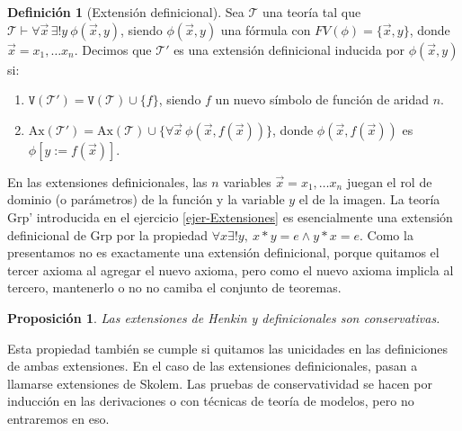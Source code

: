 \documentclass[a4paper, 12pt]{report}
\newcommand{\te}{\text}
\newtheorem{prop}[teorema]{Proposición}
\theoremstyle{definition}
\newtheorem{definicion}[teorema]{Definición}
\begin{document}
\begin{definicion}[Extensión definicional]
	Sea $\mathcal{T}$ una teoría tal que $\mathcal{T}\vdash\forall \vec{x}\,\exists!y~\phi(\vec{x},y)$, siendo $\phi(\vec{x},y)$ una fórmula con $FV(\phi)=\{\vec{x},y\}$, donde $\vec{x}=x_1,\dots x_n$. Decimos que $\mathcal{T}'$ es una extensión definicional inducida por $\phi(\vec{x},y)$ si:
	\begin{enumerate}
		\item $\mathtt{V}(\mathcal{T}')=\mathtt{V}(\mathcal{T})\cup\{f\}$, siendo $f$ un nuevo símbolo de función de aridad $n$.
		\item $\te{Ax}(\mathcal{T}')=\te{Ax}(\mathcal{T})\cup\{\forall \vec{x}~\phi(\vec{x},f(\vec{x}))\}$, donde $\phi(\vec{x},f(\vec{x}))$ es $\phi[y:=f(\vec{x})]$.
	\end{enumerate}
\end{definicion}
En las extensiones definicionales, las $n$ variables $\vec{x}=x_1,\dots x_n$ juegan el rol de dominio (o parámetros) de la función y la variable $y$ el de la imagen. La teoría Grp' introducida en el ejercicio \ref{ejer-Extensiones} es esencialmente una extensión definicional de Grp por la propiedad $\forall x\exists!y,~x*y=e\wedge y*x=e$. Como la presentamos no es exactamente una extensión definicional, porque quitamos el tercer axioma al agregar el nuevo axioma, pero como el nuevo axioma implicla al tercero, mantenerlo o no no camiba el conjunto de teoremas.

\begin{prop}
	Las extensiones de Henkin y definicionales son conservativas.
\end{prop}
Esta propiedad también se cumple si quitamos las unicidades en las definiciones de ambas extensiones. En el caso de las extensiones definicionales, pasan a llamarse extensiones de Skolem. Las pruebas de conservatividad se hacen por inducción en las derivaciones o con técnicas de teoría de modelos, pero no entraremos en eso.
\end{document}
